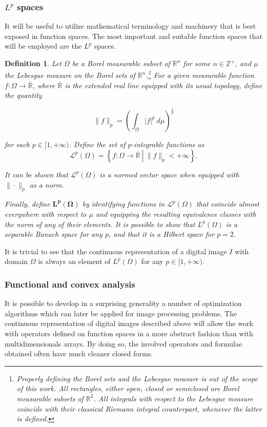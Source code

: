 \documentclass[twocolumn,twoside,a4paper,10pt]{IEEEtran}
\newtheorem{definition}{Definition}
\begin{document}
\subsubsection{\(L^p\) spaces}
It will be useful to utilize mathematical terminology and machinery that is best exposed in function spaces. The most important and suitable function spaces that will be employed are the \(L^p\) spaces.

\begin{definition}
  Let \(\Omega\) be a Borel measurable subset of \(\mathbb{R}^n\) for some \(n\in \mathbb{Z}^+\), and \(\mu\) the Lebesgue measure on the Borel sets of \(\mathbb{R}^n\).\footnote{Properly defining the Borel sets and the Lebesgue measure is out of the scope of this work. All rectangles, either open, closed or semiclosed are Borel measurable subsets of \(\mathbb{R}^2\). All integrals with respect to the Lebesgue measure coincide with their classical Riemann integral counterpart, whenever the latter is defined.} For a given measurable function \(f\colon \Omega\to \overline{\mathbb{R}}\), where \(\overline{\mathbb{R}}\) is the extended real line equipped with its usual topology, define the quantity

  \[
    \|f\|_{p} = \left(\int_{\Omega}|f|^p~d\mu\right)^{\frac 1p}
  \]

  for each \(p\in[1, +\infty)\). Define the set of \(p\)-integrable functions as 
  \[
    \mathcal{L}^p(\Omega) = \left\{f\colon\Omega\to \mathbb{\overline{R}}~\left|~\|f\|_{p}<+\infty\right.\right\}
  .\]

  It can be shown that \(\mathcal{L}^p(\Omega)\) is a normed vector space when equipped with \(\|\cdot\|_{p}\) as a norm.

  Finally, define \(\bm{L^p(\Omega)}\) by identifying functions in \(\mathcal{L}^p(\Omega)\) that coincide almost everywhere with respect to \(\mu\) and equipping the resulting equivalence classes with the norm of any of their elements. It is possible to show that \(L^p(\Omega)\) is a separable Banach space for any \(p\), and that it is a Hilbert space for \(p=2\).
\end{definition}

It is trivial to see that the continuous representation of a digital image \(I\) with domain \(\Omega\) is always an element of \(L^p(\Omega)\) for any \(p\in[1, +\infty)\).

\subsubsection{Functional and convex analysis} It is possible to develop in a surprising generality a number of optimization algorithms which can later be applied for image processing problems. The continuous representation of digital images described above will allow the work with operators defined on function spaces in a more abstract fashion than with multidimensionals arrays. By doing so, the involved operators and formulae obtained often have much cleaner closed forms. 
\end{document}
